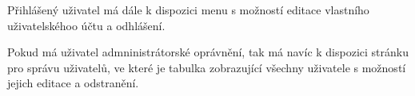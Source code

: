 Přihlášený uživatel má dále k dispozici menu s možností editace vlastního uživatelskéhoo účtu a odhlášení.

Pokud má uživatel admninistrátorské oprávnění, tak má navíc k dispozici stránku pro správu uživatelů, ve které je tabulka zobrazující všechny uživatele s možností jejich editace a odstranění.

